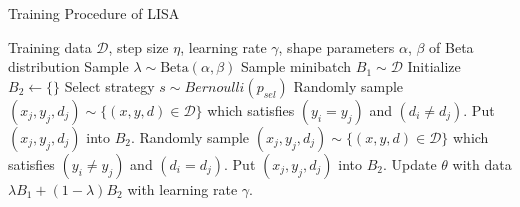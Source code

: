 \begin{algorithm}[H]
    \caption{Training Procedure of LISA}
    \label{alg:ilsa}
    \begin{algorithmic}[1]
    \REQUIRE Training data $\mathcal{D}$, step size $\eta$, learning rate $\gamma$, shape parameters $\alpha$, $\beta$ of Beta distribution
    \STATE Sample $\lambda \sim \mathrm{Beta}(\alpha, \beta)$
    \STATE Sample minibatch $B_1 \sim \mathcal{D}$
    \STATE Initialize $B_2 \leftarrow \{\}$
    \STATE Select strategy $s\sim Bernoulli(p_{sel})$
     
        \STATE Randomly sample $(x_j, y_j, d_j) \sim \{(x,y,d) \in \mathcal{D}\}$ which satisfies $(y_i=y_j)$ and $(d_i\neq d_j)$. 
        \STATE Put $(x_j, y_j, d_j)$ into $B_2$. 
    \ENDFOR
    \ELSE {}
        \STATE Randomly sample $(x_j, y_j, d_j) \sim \{(x,y,d) \in \mathcal{D}\}$ which satisfies $(y_i\neq y_j)$ and $(d_i= d_j)$. 
        \STATE Put $(x_j, y_j, d_j)$ into $B_2$. 
    \ENDFOR
    \ENDIF
    \STATE Update $\theta$ with data $\lambda B_1 + (1-\lambda) B_2$ with learning rate $\gamma$. 
    \ENDWHILE
    \end{algorithmic}
\end{algorithm}
